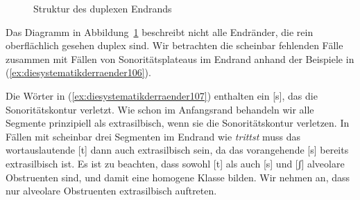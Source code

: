 \begin{figure}[!htbp]
  \caption{Struktur des duplexen Endrands}
  \label{fig:diesystematikderraender105}
\end{figure}

Das Diagramm in Abbildung~\ref{fig:diesystematikderraender105} beschreibt nicht alle Endränder, die rein oberflächlich gesehen duplex sind.
Wir betrachten die scheinbar fehlenden Fälle zusammen mit Fällen von Sonoritätsplateaus im Endrand anhand der Beispiele in (\ref{ex:diesystematikderraender106}).

\begin{exe}
  \ex \label{ex:diesystematikderraender106}
  \begin{xlist}
  \end{xlist}
\end{exe}

Die Wörter in (\ref{ex:diesystematikderraender107}) enthalten ein [s], das die Sonoritätskontur verletzt.
Wie schon im Anfangsrand behandeln wir alle Segmente prinzipiell als extrasilbisch, wenn sie die Sonoritätskontur verletzen.
In Fällen mit scheinbar drei Segmenten im Endrand wie \textit{trittst} muss das wortauslautende [t] dann auch extrasilbisch sein, da das vorangehende [s] bereits extrasilbisch ist.
Es ist zu beachten, dass sowohl [t] als auch [s] und [ʃ] alveolare Obstruenten sind, und damit eine homogene Klasse bilden.
Wir nehmen an, dass nur alveolare Obstruenten extrasilbisch auftreten.

